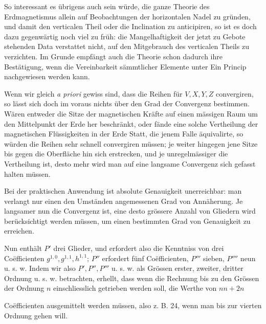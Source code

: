 So interessant es übrigens auch sein würde, die ganze Theorie des Erdmagnetismus allein auf Beobachtungen der horizontalen Nadel zu gründen, und damit den verticalen Theil oder die Inclination zu anticipiren, so ist es doch dazu gegenwärtig noch viel zu früh: die Mangelhaftigkeit der jetzt zu Gebote stehenden Data verstattet nicht, auf den Mitgebrauch des verticalen Theils zu verzichten. Im Grunde empfängt auch die Theorie schon dadurch ihre Bestätigung, wenn die Vereinbarkeit sämmtlicher Elemente unter Ein Princip nachgewiesen werden kann.

Wenn wir gleich \textit{a priori} gewiss sind, dass die Reihen für $V,X,Y,Z$ convergiren, so lässt sich doch im voraus nichts über den Grad der Convergenz bestimmen. Wären entweder die Sitze der magnetischen Kräfte auf einen mässigen Raum um den Mittelpunkt der Erde her beschränkt, oder fände eine solche Vertheilung der magnetischen Flüssigkeiten in der Erde Statt, die jenem Falle äquivalirte, so würden die Reihen sehr schnell convergiren müssen; je weiter hingegen jene Sitze bis gegen die Oberfläche hin sich erstrecken, und je unregelmässiger die Vertheilung ist, desto mehr wird man auf eine langsame Convergenz sich gefasst halten müssen.

Bei der praktischen Anwendung ist absolute Genauigkeit unerreichbar: man verlangt nur einen den Umständen angemessenen Grad von Annäherung. Je langsamer nun die Convergenz ist, eine desto grössere Anzahl von Gliedern wird berücksichtigt werden müssen, um einen bestimmten Grad von Genauigkeit zu erreichen.

Nun enthält $P'$ drei Glieder, und erfordert also die Kenntniss von drei Coëfficienten $g^{1,0},g^{1,1},h^{1,1}$; $P''$ erfordert fünf Coëfficienten, $P'''$ sieben, $P''''$ neun u. s. w. Indem wir also $P',P'',P'''$ u. s. w. als Grössen erster, zweiter, dritter Ordnung u. s. w. betrachten, erhellt, dass wenn die Rechnung bis zu den Grössen der Ordnung $n$ einschliesslich getrieben werden soll, die Werthe von $nn+2n$
\par{}
\par\clearpage
{}
\noindent Coëfficienten ausgemittelt werden müssen, also z. B. 24, wenn man bis zur vierten Ordnung gehen will.

